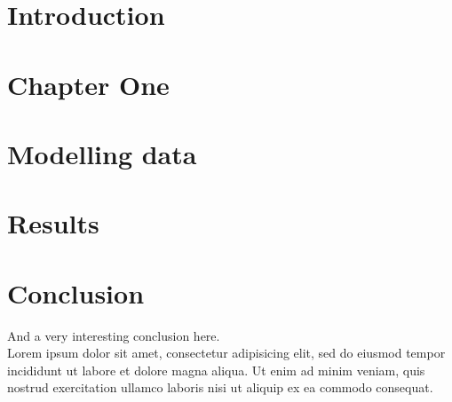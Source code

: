 \documentclass[a4paper, oneside, english, 12pt, final]{extreport}
\newcommand{\appendixpagenumbering}{
  \break
  \pagenumbering{arabic}
  \renewcommand{\thepage}{\thechapter-\arabic{page}}
}
\begin{document}

\chapter*{Introduction}
\label{chap:general_intorduction}
%



\chapter{Chapter One}%
\label{chap:chapterone}



\chapter{Modelling data}
\label{chap:2}


\chapter{Results}
\label{chap:3}
%
%



\chapter*{Conclusion}
\label{chap:conclusion}
%

  And a very interesting conclusion here\@. ~\\
  Lorem ipsum dolor sit amet, consectetur adipisicing elit, sed do eiusmod
  tempor incididunt ut labore et dolore magna aliqua. Ut enim ad minim veniam,
  quis nostrud exercitation ullamco laboris nisi ut aliquip ex ea commodo
  consequat.


%



\newpage
\appendix
\appendixpagenumbering
{}




\cleardoublepage%


\printindex


\end{document}
